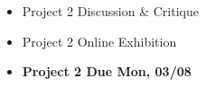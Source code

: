 \def\dMon{Mon, 03/08}
\def\dTues{Tues, 03/09}
\def\dWed{Wed, 03/10}
\def\dThur{Thur, 03/11}
\def\dFri{Fri, 03/12}
\def\dSat{Sat, 03/13}
\def\dSun{Sun, 03/14}
\placeDate

\begin{itemize}[noitemsep,topsep=0pt,leftmargin=*]
    \item Project 2 Discussion \& Critique
    \item Project 2 Online Exhibition
\end{itemize}
\begin{itemize}[noitemsep,topsep=0pt,leftmargin=*]
    \item \textcolor{defaultColor}{\textbf{Project 2 Due \dMon}}
\end{itemize}